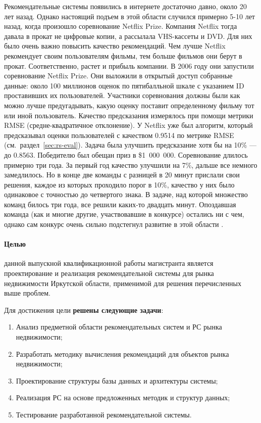 \documentclass[a4paper,14pt,openany,final]{extreport} %
\begin{document}
Рекомендательные системы появились в интернете достаточно давно, около 20 лет назад. Однако настоящий подъем в этой области случился примерно 5-10 лет назад, когда произошло соревнование Netflix Prize. Компания Netflix тогда давала в прокат не цифровые копии, а рассылала VHS-кассеты и DVD. Для них было очень важно повысить качество рекомендаций. Чем лучше Netflix рекомендует своим пользователям фильмы, тем больше фильмов они берут в прокат. Соответственно, растет и прибыль компании. В 2006 году они запустили соревнование Netflix Prize. Они выложили в открытый доступ собранные данные: около 100 миллионов оценок по пятибалльной шкале с указанием ID проставивших их пользователей. Участники соревнования должны были как можно лучше предугадывать, какую оценку поставит определенному фильму тот или иной пользователь. Качество предсказания измерялось при помощи метрики RMSE (средне-квадратичное отклонение). У Netflix уже был алгоритм, который предсказывал оценки пользователей с качеством 0.9514 по метрике RMSE (см.~раздел~\ref{sec:rs-eval}). Задача была улучшить предсказание хотя бы на 10\% — до 0.8563. Победителю был обещан приз в \$1~000~000. Соревнование длилось примерно три года. За первый год качество улучшили на 7\%, дальше все немного замедлилось. Но в конце две команды с разницей в 20 минут прислали свои решения, каждое из которых проходило порог в 10\%, качество у них было одинаковое с точностью до четвертого знака. В задаче, над которой множество команд билось три года, все решили каких-то двадцать минут. Опоздавшая команда (как и многие другие, участвовавшие в конкурсе) остались ни с чем, однако сам конкурс очень сильно подстегнул развитие в этой области \cite{b2}.

\paragraph{Целью}\hspace{-1em} данной выпускной квалификационной работы магистранта является проектирование и реализация рекомендательной системы для рынка недвижимости Иркутской области, применимой для решения перечисленных выше проблем.

Для достижения цели \textbf{решены следующие задачи}:
\begin{enumerate}
\item Анализ предметной области рекомендательных систем и РС рынка недвижимости;
\item Разработать методику вычисления рекомендаций для объектов рынка недвижимости;
\item Проектирование структуры базы данных и архитектуры системы;
\item Реализация РС на основе предложенных методик и структур данных;
\item Тестирование разработанной рекомендательной системы.
\end{enumerate}
\end{document}
